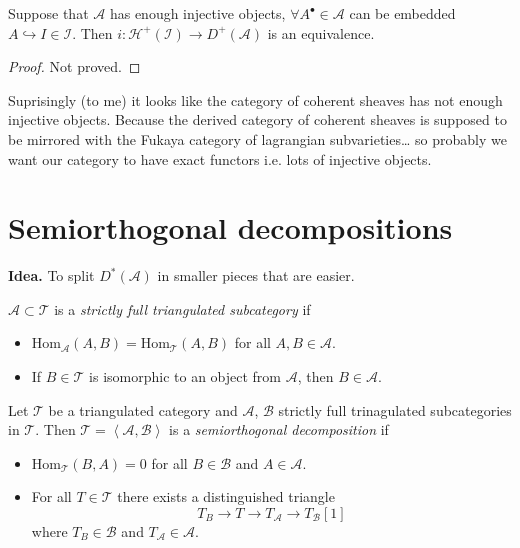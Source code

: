 \begin{lemma}
\label{lemma-embedding-of-injective-subcategory}
Suppose that $\mathcal{A}$ has enough injective objects, 
$\forall A^\bullet \in \mathcal{A}$ can be embedded 
$A \hookrightarrow I \in\mathcal{I}$. Then 
$i:\mathcal{H}^+(\mathcal{I}) \to D^+(\mathcal{A})$ is an equivalence.
\end{lemma}

\begin{proof}
Not proved.
\end{proof}

Suprisingly (to me) it looks like the category of coherent sheaves has not
enough injective objects. Because the derived category of coherent sheaves is
supposed to be mirrored with the Fukaya category of lagrangian subvarieties… so
probably we want our category to have exact functors i.e. lots of injective
objects.

\section{Semiorthogonal decompositions}
\label{subsection-semiorthogonal-decompositions}

{\bf Idea.} To split $D^*(\mathcal{A})$ in smaller pieces that are easier.

\begin{definition}
\label{definition-strictly-full-triangulated-subcategory}
$\mathcal{A} \subset \mathcal{T}$ is a {\it strictly full triangulated
subcategory} if
\begin{itemize}
\item $\text{Hom}_{\mathcal{A}}(A,B)=\text{Hom}_{\mathcal{T}}(A,B)$ for all $A,B
\in \mathcal{A}$.
\item If  $B \in \mathcal{T}$ is isomorphic to an object from $\mathcal{A}$,
then $B \in \mathcal{A}$.
\end{itemize}
\end{definition}

\begin{definition}
\label{definition-semiorthogonal-decomposition}
Let $\mathcal{T}$ be a triangulated category and $\mathcal{A}$, $\mathcal{B}$
strictly full trinagulated subcategories in $\mathcal{T}$. Then
$\mathcal{T}=\left<\mathcal{A},\mathcal{B}\right>$ is a {\it semiorthogonal
decomposition} if
\begin{itemize}
\item $\text{Hom}_{\mathcal{T}}(B,A)=0$ for all $B \in \mathcal{B}$ and $A\in
\mathcal{A}$.
\item For all $T \in \mathcal{T}$ there exists a distinguished triangle
$$
T_B \to T \to T_{\mathcal{A}}\to T_{\mathcal{B}}[1]
$$
where $T_B \in \mathcal{B}$ and $T_\mathcal{A} \in \mathcal{A}$.
\end{itemize}
\end{definition}

